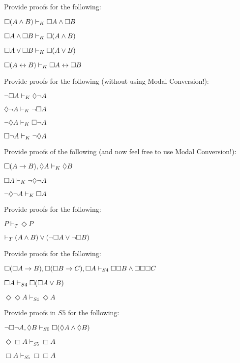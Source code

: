 \practiceproblems

\problempart
Provide proofs for the following:
\begin{earg}
\item $\Box (A\wedge B)\vdash_K\Box A \wedge \Box B$
\item $\Box A\wedge\Box B\vdash_K\Box( A \wedge  B)$
\item $\Box A\vee\Box B\vdash_K\Box( A \vee  B)$
\item $\Box (A \leftrightarrow B)\vdash_K \Box A \leftrightarrow \Box B$
\end{earg}

\problempart
Provide proofs for the following (without using Modal Conversion!):
\begin{earg}
\item $\neg\Box A\vdash_K \Diamond \neg A$
\item $\Diamond\neg A\vdash_K\neg \Box A$
\item $\neg\Diamond A\vdash_K\Box\neg A$
\item $\Box\neg A\vdash_K\neg\Diamond A$
\end{earg}

\problempart
Provide proofs of the following (and now feel free to use Modal Conversion!):
\begin{earg}
\item $\Box(A\rightarrow B), \Diamond A \vdash_K \Diamond B$
\item $\Box A \vdash_K \neg\Diamond\neg A$
\item $\neg\Diamond\neg A \vdash_K \Box A$
\end{earg}

\problempart
Provide proofs for the following:
\begin{earg}
\item $P\vdash_T\Diamond P$
\item $\vdash_T (A\wedge B)\vee(\neg \Box A\vee\neg\Box B)$
\end{earg}

\problempart
Provide proofs for the following:
\begin{earg}
\item $\Box(\Box A\rightarrow B), \Box (\Box B\rightarrow C), \Box A \vdash_{S4}\Box\Box B \wedge \Box\Box\Box C$
\item $\Box A \vdash_{S4} \Box(\Box A \vee B)$
\item $\Diamond \Diamond A \vdash_{S4} \Diamond A$
\end{earg}


\problempart
Provide proofs in $S5$ for the following:
\begin{earg}
\item $\neg\Box\neg A, \Diamond B\vdash_{S5}\Box(\Diamond A \wedge \Diamond B)$
\item $\Diamond\Box A\vdash_{S5}\Box A$
\item $\Box A\vdash_{S5}\Box\Box A$
\end{earg}


